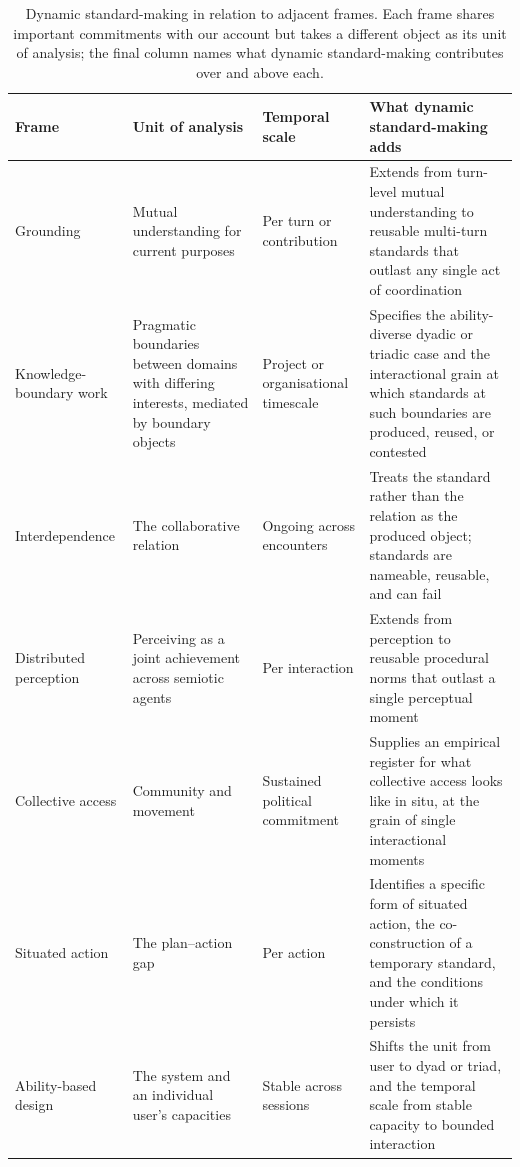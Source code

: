 \begin{table}[]
\small
\begin{tabular}{@{}p{2.6cm}p{2.6cm}p{2.6cm}p{5cm}@{}}
\toprule
\textbf{Frame} & \textbf{Unit of analysis} & \textbf{Temporal scale} & \textbf{What dynamic standard-making adds} \\
\midrule
Grounding \cite{clark_grounding_1991} & Mutual understanding for current purposes & Per turn or contribution & Extends from turn-level mutual understanding to reusable multi-turn standards that outlast any single act of coordination \\
Knowledge-boundary work \cite{carlile_transferring_2004} & Pragmatic boundaries between domains with differing interests, mediated by boundary objects & Project or organisational timescale & Specifies the ability-diverse dyadic or triadic case and the interactional grain at which standards at such boundaries are produced, reused, or contested \\
Interdependence \cite{bennett_interdependence_2018} & The collaborative relation & Ongoing across encounters & Treats the standard rather than the relation as the produced object; standards are nameable, reusable, and can fail \\
Distributed perception \cite{due_distributed_2021} & Perceiving as a joint achievement across semiotic agents & Per interaction & Extends from perception to reusable procedural norms that outlast a single perceptual moment \\
Collective access \cite{mia_mingus_access_2017} & Community and movement & Sustained political commitment & Supplies an empirical register for what collective access looks like in situ, at the grain of single interactional moments \\
Situated action \cite{suchman_human-machine_2006} & The plan--action gap & Per action & Identifies a specific form of situated action, the co-construction of a temporary standard, and the conditions under which it persists \\
Ability-based design \cite{wobbrock_ability-based_2011} & The system and an individual user's capacities & Stable across sessions & Shifts the unit from user to dyad or triad, and the temporal scale from stable capacity to bounded interaction \\
\bottomrule
\end{tabular}
\caption{Dynamic standard-making in relation to adjacent frames. Each frame shares important commitments with our account but takes a different object as its unit of analysis; the final column names what dynamic standard-making contributes over and above each.}
\label{tab:concepts}
\end{table}

